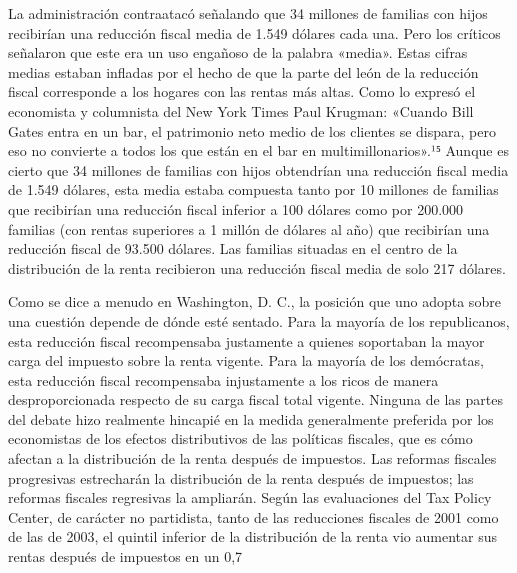 \documentclass[10pt,a4paper]{article}
\begin{document}
La administración contraatacó señalando que 34 millones de familias con hijos recibirían una reducción fiscal media de 1.549 dólares cada una. Pero los críticos señalaron que este era un uso engañoso de la palabra «media». Estas cifras medias estaban infladas por el hecho de que la parte del león de la reducción fiscal corresponde a los hogares con las rentas más altas. Como lo expresó el economista y columnista del New York Times Paul Krugman: «Cuando Bill Gates entra en un bar, el patrimonio neto medio de los clientes se dispara, pero eso no convierte a todos los que están en el bar en multimillonarios».¹⁵ Aunque es cierto que 34 millones de familias con hijos obtendrían una reducción fiscal media de 1.549 dólares, esta media estaba compuesta tanto por 10 millones de familias que recibirían una reducción fiscal inferior a 100 dólares como por 200.000 familias (con rentas superiores a 1 millón de dólares al año) que recibirían una reducción fiscal de 93.500 dólares. Las familias situadas en el centro de la distribución de la renta recibieron una reducción fiscal media de solo 217 dólares.

Como se dice a menudo en Washington, D. C., la posición que uno adopta sobre una cuestión depende de dónde esté sentado. Para la mayoría de los republicanos, esta reducción fiscal recompensaba justamente a quienes soportaban la mayor carga del impuesto sobre la renta vigente. Para la mayoría de los demócratas, esta reducción fiscal recompensaba injustamente a los ricos de manera desproporcionada respecto de su carga fiscal total vigente. Ninguna de las partes del debate hizo realmente hincapié en la medida generalmente preferida por los economistas de los efectos distributivos de las políticas fiscales, que es cómo afectan a la distribución de la renta después de impuestos. Las reformas fiscales progresivas estrecharán la distribución de la renta después de impuestos; las reformas fiscales regresivas la ampliarán. Según las evaluaciones del Tax Policy Center, de carácter no partidista, tanto de las reducciones fiscales de 2001 como de las de 2003, el quintil inferior de la distribución de la renta vio aumentar sus rentas después de impuestos en un 0,7 %
\end{document}
